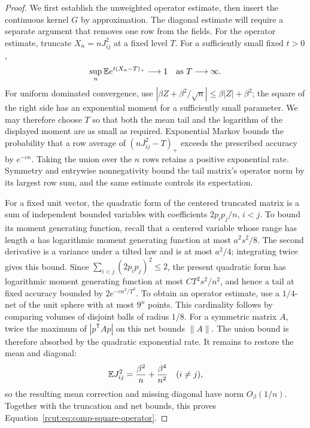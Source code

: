 \begin{proof}
 We first establish the unweighted operator estimate, then insert the
 continuous kernel $G$ by approximation.  The diagonal estimate will
 require a separate argument that removes one row from the fields.
 For the operator estimate, truncate $X_n=nJ_{ij}^2$ at a fixed level $T$.
 For a sufficiently small fixed $t>0$,
 \[
  \sup_n\mathbb E e^{t(X_n-T)_+}\longrightarrow1
       \quad\text{as }T\longrightarrow\infty.
 \]
 For uniform dominated convergence, use
 $|\beta Z+\beta^2/\sqrt n|\le\beta|Z|+\beta^2$; the square of
 the right side has an exponential moment for a sufficiently small
 parameter.  We may therefore choose $T$ so that both the mean tail
 and the logarithm of the displayed moment are as small as required.
 Exponential Markov bounds the probability that a row average of
 $(nJ_{ij}^2-T)_+$ exceeds the prescribed accuracy by $e^{-cn}$.
 Taking the union over the $n$ rows retains a positive exponential
 rate.  Symmetry and entrywise nonnegativity bound the tail matrix's
 operator norm by its largest row sum, and the same estimate controls
 its expectation.

 For a fixed unit vector, the quadratic form of the centered truncated
 matrix is a sum of independent bounded variables with coefficients
 $2p_ip_j/n$, $i<j$.  To bound its moment generating function, recall
 that a centered variable whose range has length $a$ has logarithmic
 moment generating function at most $a^2s^2/8$.  The second derivative
 is a variance under a tilted law and is at most $a^2/4$; integrating
 twice gives this bound.  Since
 $\sum_{i<j}(2p_ip_j)^2\le2$, the present quadratic form has logarithmic
 moment generating function at most $CT^2s^2/n^2$, and hence a tail
 at fixed accuracy bounded by $2e^{-c n^2/T^2}$.
 To obtain an operator estimate, use a $1/4$-net of the unit sphere
 with at most $9^n$ points.  This cardinality follows by comparing
 volumes of disjoint balls of radius $1/8$.  For a symmetric matrix
 $A$, twice the maximum of $|p^{\mathsf T}Ap|$ on this net bounds
 $\|A\|$.  The union bound is therefore absorbed by the quadratic
 exponential rate.  It remains to restore the mean and diagonal:
 \[
  \mathbb E J_{ij}^2=\frac{\beta^2}{n}+\frac{\beta^4}{n^2}
       \quad(i\ne j),
 \]
 so the resulting mean correction and missing diagonal have norm
 $O_\beta(1/n)$.  Together with the truncation and net bounds, this
 proves Equation~\eqref{rcut:eq:comp-square-operator}.


\end{proof}
